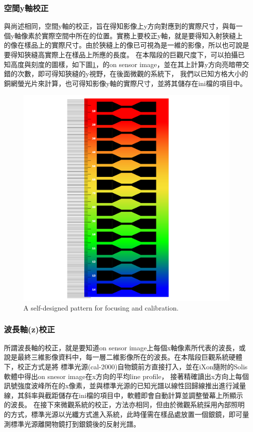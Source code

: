 \documentclass[12pt]{article}
\begin{document}
    \subsubsection{空間y軸校正}
    與尚述相同，空間y軸的校正，旨在得知影像上y方向對應到的實際尺寸，與每一個y軸像素於實際空間中所在的位置。實務上要校正y軸，就是要得知入射狹縫上的像在樣品上的實際尺寸。由於狹縫上的像已可視為是一維的影像，所以也可說是要得知狹縫高實際上在樣品上所應的長度。
    在本階段的巨觀尺度下，可以拍攝已知高度與刻度的圖樣，如下圖\ref{figure: self pattern}，的on sensor image，並在其上計算y方向亮暗帶交錯的次數，即可得知狹縫的y視野，在後面微觀的系統下，
    我們以已知方格大小的銅網螢光片來計算，也可得知影像y軸的實際尺寸，並將其儲存在ini檔的項目中。
    \begin{figure}[t]
        \centering
        \includegraphics[width=0.4\linewidth]{patternColor.jpg}
        \caption{A self-designed pattern for focusing and calibration.}
        \label{figure: self pattern}
    \end{figure}
    \subsubsection{波長軸(z)校正}
    所謂波長軸的校正，就是要知道on sensor image上每個x軸像素所代表的波長，或說是最終三維影像資料中，每一層二維影像所在的波長。在本階段巨觀系統硬體下，校正方式是將
    標準光源(cal-2000)自物鏡前方直接打入，並在iXon隨附的Solis軟體中得出on snesor image在x方向的平均line profile，
    接著精確讀出x方向上每個訊號強度波峰所在的x像素，並與標準光源的已知光譜以線性回歸線推出進行減量線，其斜率與截距儲存在ini檔的項目中，軟體即會自動計算並調整螢幕上所顯示的波長。
    在接下來微觀系統的校正，方法亦相同，但由於微觀系統採用內部照明的方式，標準光源以光纖方式進入系統，此時僅需在樣品處放置一個銀鏡，即可量測標準光源離開物鏡打到銀鏡後的反射光譜。
    
\end{document}
